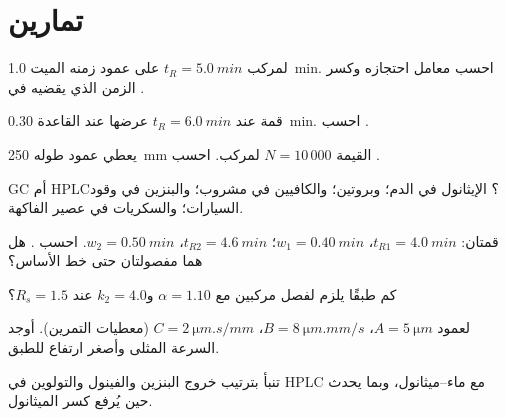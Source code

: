 \section{تمارين}

\begin{exercise}[$\star$]\label{exo:b2:chromatography:1}
لمركب $t_R = \qty{5.0}{min}$ على عمود زمنه الميت \qty{1.0}{min}. احسب
معامل احتجازه وكسر الزمن الذي يقضيه في .
\end{exercise}

\begin{exercise}[$\star$]\label{exo:b2:chromatography:2}
قمة عند $t_R = \qty{6.0}{min}$ عرضها عند القاعدة \qty{0.30}{min}. احسب .
\end{exercise}

\begin{exercise}[$\star$]\label{exo:b2:chromatography:3}
يعطي عمود طوله \qty{250}{mm} القيمة $N = 10\,000$ لمركب. احسب .
\end{exercise}

\begin{exercise}[$\star$]\label{exo:b2:chromatography:4}
GC أم HPLC؟ الإيثانول في الدم؛ وبروتين؛ والكافيين في مشروب؛ والبنزين في وقود السيارات؛ والسكريات في عصير الفاكهة.
\end{exercise}

\begin{exercise}[$\star\star$]\label{exo:b2:chromatography:5}
قمتان: $t_{R1} = \qty{4.0}{min}$، $w_1 = \qty{0.40}{min}$؛ $t_{R2} = \qty{4.6}{min}$، $w_2 =
\qty{0.50}{min}$. احسب . هل هما مفصولتان حتى خط الأساس؟
\end{exercise}

\begin{exercise}[$\star\star$]\label{exo:b2:chromatography:6}
كم طبقًا يلزم لفصل مركبين مع $\alpha = 1.10$ و$k_2 = 4.0$ عند
$R_s = 1.5$؟
\end{exercise}

\begin{exercise}[$\star\star$]\label{exo:b2:chromatography:7}
لعمود $A = \qty{5}{\micro m}$، $B = \qty{8}{\micro m.mm/s}$، $C = \qty{2}{\micro m.s/mm}$
(معطيات التمرين). أوجد السرعة المثلى وأصغر ارتفاع للطبق.
\end{exercise}

\begin{exercise}[$\star\star$]\label{exo:b2:chromatography:8}
تنبأ بترتيب خروج البنزين والفينول والتولوين في HPLC  مع 
ماء--ميثانول، وبما يحدث حين يُرفع كسر الميثانول.
\end{exercise}

